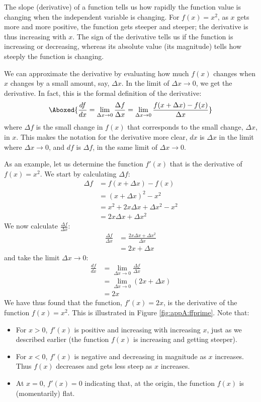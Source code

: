 The slope (derivative) of a function tells us how rapidly the function value is changing when the independent variable is changing. For $f(x)=x^2$, as $x$ gets more and more positive, the function gets steeper and steeper; the derivative is thus increasing with $x$. The sign of the derivative tells us if the function is increasing or decreasing, whereas its absolute value (its magnitude) tells how steeply the function is changing.

We can approximate the derivative by evaluating how much $f(x)$ changes when $x$ changes by a small amount, say, $\Delta x$. In the limit of $\Delta x\to 0$, we get the derivative. In fact, this is the formal definition of the derivative: 
\begin{align}
\label{eqn:appA:derdef}
\Aboxed{\frac{df}{dx}=\lim_{\Delta x\to 0}\frac{\Delta f}{\Delta x} =\lim_{\Delta x\to 0}\frac{f(x+\Delta x)-f(x)}{\Delta x} }
\end{align}
where $\Delta f$ is the small change in $f(x)$ that corresponds to the small change, $\Delta x$, in $x$. This makes the notation for the derivative more clear, $dx$ is $\Delta x$ in the limit where $\Delta x\to0$, and $df$ is $\Delta f$, in the same limit of $\Delta x\to 0$.

As an example, let us determine the function $f'(x)$ that is the derivative of $f(x)=x^2$. We start by calculating $\Delta f$:
\begin{align*}
\Delta f &= f(x+\Delta x)-f(x)\\
&=(x+\Delta x)^2 - x^2\\
&=x^2+2x\Delta x+\Delta x^2 -x^2\\
&=2x\Delta x+\Delta x^2
\end{align*}
We now calculate $\frac{\Delta f}{\Delta x}$:
\begin{align*}
\frac{\Delta f}{\Delta x}&=\frac{2x\Delta x+\Delta x^2}{\Delta x}\\
&=2x+\Delta x
\end{align*}
and take the limit $\Delta x\to 0$:
\begin{align*}
\frac{df}{dx}&=\lim_{\Delta x\to 0 }\frac{\Delta f}{\Delta x}\\
&=\lim_{\Delta x\to 0 }(2x+\Delta x)\\
&=2x
\end{align*}
We have thus found that the function, $f'(x)=2x$, is the derivative of the function $f(x)=x^2$. This is illustrated in Figure \ref{fig:appA:ffprime}. Note that:
\begin{itemize}
\item For $x>0$, $f'(x)$ is positive and increasing with increasing $x$, just as we described earlier (the function $f(x)$ is increasing and getting steeper).
\item For $x<0$, $f'(x)$ is negative and decreasing in magnitude as $x$ increases. Thus $f(x)$ decreases and gets less steep as $x$ increases.
\item At $x=0$, $f'(x)=0$ indicating that, at the origin, the function $f(x)$ is (momentarily) flat.
\end{itemize}   

